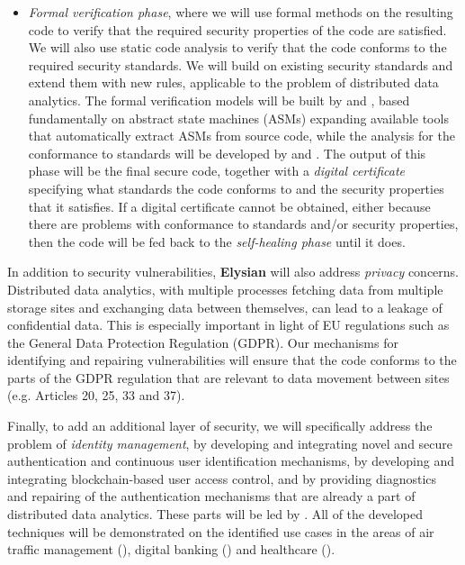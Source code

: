 \documentclass[a4paper,11pt]{article}
\newcommand{\project}[1]{\textbf{#1}\xspace}
\newcommand{\SECURITY}{\project{Elysian}}
\newcommand{\TheProject}{\SECURITY}
\begin{document}
\begin{itemize}
\item \emph{Formal verification phase}, where we will use formal methods on the resulting code to verify that the required security properties of the code are satisfied. We will also use static code analysis to verify that the code conforms to the required security standards. We will build on existing security standards 
and extend them with new rules, applicable to the problem of distributed data analytics. The formal verification models will be built by \SCCHshort{} and \SAshort{}, based fundamentally on abstract state machines (ASMs) expanding available tools that automatically extract ASMs from source code, while the analysis for the conformance to standards will be developed by \UCMshort{} and \YAGshort{}. The output of this phase will be the final secure code, together with a \emph{digital certificate} specifying what standards the code conforms to and the security properties that it satisfies. If a digital certificate cannot be obtained, either because there are problems with conformance to standards and/or security properties, then the code will be fed back to the \emph{self-healing phase} until it does.
\end{itemize}

In addition to security vulnerabilities, \TheProject{} will also address \emph{privacy} concerns. Distributed data analytics, with multiple processes %
fetching data from multiple storage sites and exchanging data between themselves, can lead to a leakage of confidential data. This is especially important in light of EU regulations such as the General Data Protection Regulation (GDPR). Our mechanisms for identifying and repairing vulnerabilities will ensure that the %
code conforms to the parts of the GDPR regulation that are relevant to data movement between sites (e.g. Articles 20, 25, 33 and 37). 

Finally, to add an additional layer of security, we will specifically address the problem of \emph{identity management}, by developing and integrating novel and secure authentication and continuous user identification mechanisms, by developing and integrating blockchain-based user access control, and by providing diagnostics and repairing of the authentication mechanisms that are already a part of distributed data analytics. These parts will be led by \COGNIshort{}. All of the developed techniques will be demonstrated on the identified use cases in the areas of air traffic management (\FRQshort{}), digital banking (\SOPRAshort{}) and healthcare (\SOPRAshort{}). 
\end{document}

